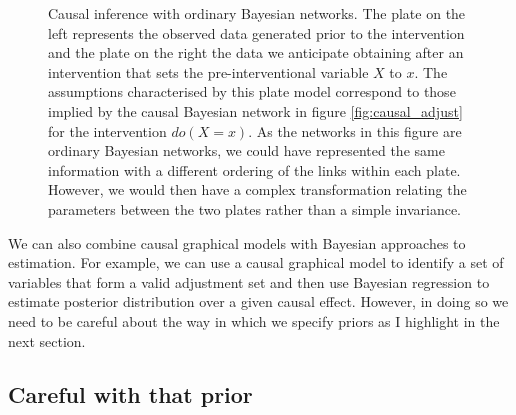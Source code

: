 \documentclass[11pt,a4paper,oneside]{book}
\theoremstyle{plain}
\theoremstyle{definition}
\begin{document}
\begin{figure}[h]
\center
{} 
\caption{Causal inference with ordinary Bayesian networks. The plate on the left represents the observed data generated prior to the intervention and the plate on the right the data we anticipate obtaining after an intervention that sets the pre-interventional variable $X$ to $x$. The assumptions characterised by this plate model correspond to those implied by the causal Bayesian network in figure \ref{fig:causal_adjust} for the intervention $do(X=x)$. As the networks in this figure are ordinary Bayesian networks, we could have represented the same information with a different ordering of the links within each plate. However, we would then have a complex transformation relating the parameters between the two plates rather than a simple invariance.}
\label{fig:causal_ordinary_bayes}
\end{figure}

We can also combine causal graphical models with Bayesian approaches to estimation. For example, we can use a causal graphical model to identify a set of variables that form a valid adjustment set and then use Bayesian regression to estimate posterior distribution over a given causal effect. However, in doing so we need to be careful about the way in which we specify priors as I highlight in the next section.  

\subsection{Careful with that prior}
\end{document}

